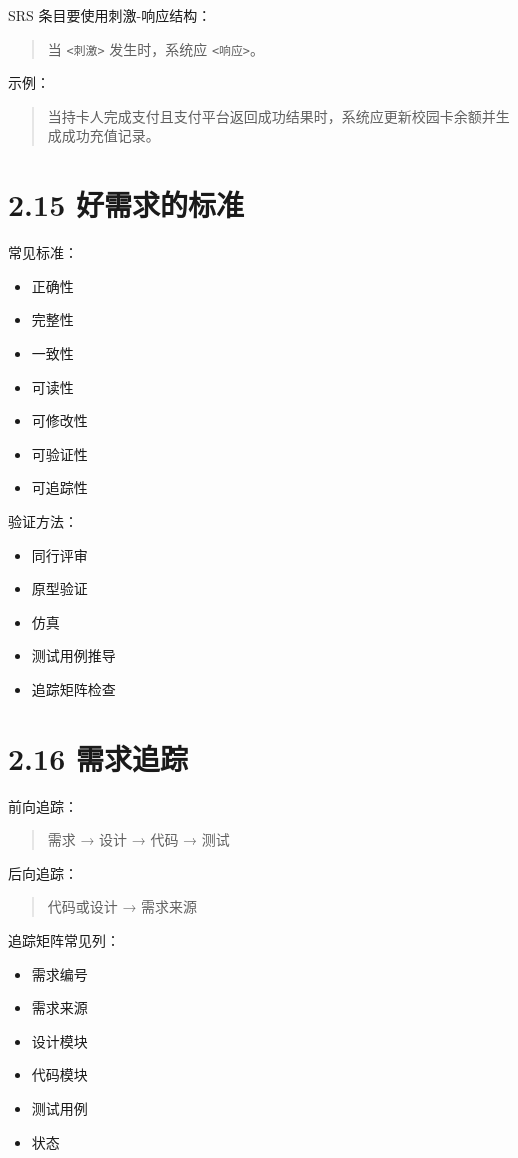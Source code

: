 \documentclass[UTF8,zihao=-4]{ctexart}
\begin{document}
SRS 条目要使用刺激-响应结构：

\begin{quote}
当 \texttt{<刺激>} 发生时，系统应 \texttt{<响应>}。
\end{quote}

示例：

\begin{quote}
当持卡人完成支付且支付平台返回成功结果时，系统应更新校园卡余额并生成成功充值记录。
\end{quote}

\section{2.15 好需求的标准}

常见标准：

\begin{itemize}
\item 正确性
\item 完整性
\item 一致性
\item 可读性
\item 可修改性
\item 可验证性
\item 可追踪性
\end{itemize}

验证方法：

\begin{itemize}
\item 同行评审
\item 原型验证
\item 仿真
\item 测试用例推导
\item 追踪矩阵检查
\end{itemize}

\section{2.16 需求追踪}

前向追踪：

\begin{quote}
需求 → 设计 → 代码 → 测试
\end{quote}

后向追踪：

\begin{quote}
代码或设计 → 需求来源
\end{quote}

追踪矩阵常见列：

\begin{itemize}
\item 需求编号
\item 需求来源
\item 设计模块
\item 代码模块
\item 测试用例
\item 状态
\end{itemize}
\end{document}
